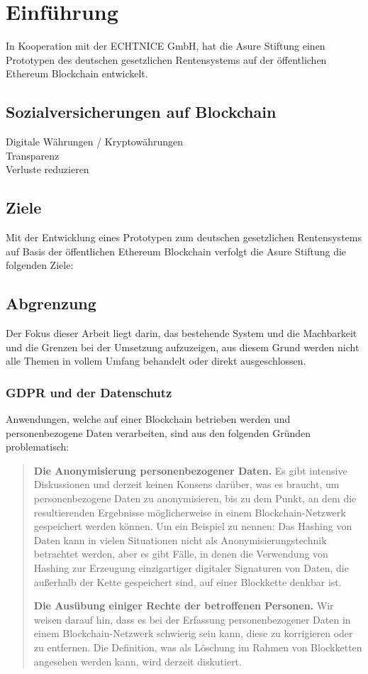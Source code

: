 \section{Einführung}
In Kooperation mit der ECHTNICE GmbH, hat die Asure Stiftung einen Prototypen des deutschen gesetzlichen Rentensystems auf der öffentlichen Ethereum Blockchain entwickelt.

\subsection{Sozialversicherungen auf Blockchain}
Digitale Währungen / Kryptowährungen\\
Transparenz\\
Verluste reduzieren\\

\subsection{Ziele}
Mit der Entwicklung eines Prototypen zum deutschen gesetzlichen Rentensystems auf Basis der öffentlichen Ethereum Blockchain verfolgt die Asure Stiftung die folgenden Ziele:

\subsection{Abgrenzung}
Der Fokus dieser Arbeit liegt darin, das bestehende System und die Machbarkeit und die Grenzen bei der Umsetzung aufzuzeigen, aus diesem Grund werden nicht alle Themen in vollem Umfang behandelt oder direkt ausgeschlossen.

\subsubsection{GDPR und der Datenschutz}
Anwendungen, welche auf einer Blockchain betrieben werden und personenbezogene Daten verarbeiten, sind aus den folgenden Gründen problematisch:

\begin{quote}
\textbf{Die Anonymisierung personenbezogener Daten.} Es gibt intensive Diskussionen und derzeit keinen Konsens darüber, was es braucht, um personenbezogene Daten zu anonymisieren, bis zu dem Punkt, an dem die resultierenden Ergebnisse möglicherweise in einem Blockchain-Netzwerk gespeichert werden können. Um ein Beispiel zu nennen: Das Hashing von Daten kann in vielen Situationen nicht als Anonymisierungstechnik betrachtet werden, aber es gibt Fälle, in denen die Verwendung von Hashing zur Erzeugung einzigartiger digitaler Signaturen von Daten, die außerhalb der Kette gespeichert sind, auf einer Blockkette denkbar ist.

\textbf{Die Ausübung einiger Rechte der betroffenen Personen.} Wir weisen darauf hin, dass es bei der Erfassung personenbezogener Daten in einem Blockchain-Netzwerk schwierig sein kann, diese zu korrigieren oder zu entfernen. Die Definition, was als Löschung im Rahmen von Blockketten angesehen werden kann, wird derzeit diskutiert.\cite{gdpr}
\end{quote}

